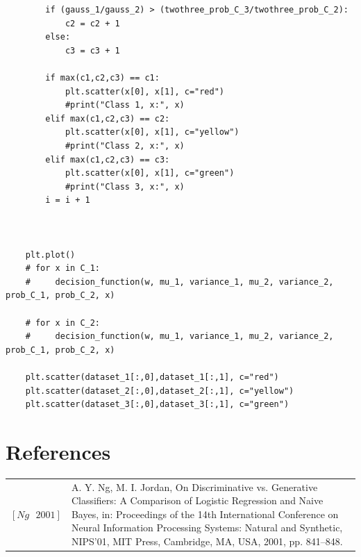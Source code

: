 \begin{lstlisting}
        if (gauss_1/gauss_2) > (twothree_prob_C_3/twothree_prob_C_2):
            c2 = c2 + 1
        else:
            c3 = c3 + 1
        
        if max(c1,c2,c3) == c1:
            plt.scatter(x[0], x[1], c="red")
            #print("Class 1, x:", x)
        elif max(c1,c2,c3) == c2:
            plt.scatter(x[0], x[1], c="yellow")
            #print("Class 2, x:", x)
        elif max(c1,c2,c3) == c3:
            plt.scatter(x[0], x[1], c="green")
            #print("Class 3, x:", x)
        i = i + 1
    
            
        
    plt.plot()
    # for x in C_1:
    #     decision_function(w, mu_1, variance_1, mu_2, variance_2, prob_C_1, prob_C_2, x)
        
    # for x in C_2:
    #     decision_function(w, mu_1, variance_1, mu_2, variance_2, prob_C_1, prob_C_2, x)
    
    plt.scatter(dataset_1[:,0],dataset_1[:,1], c="red")
    plt.scatter(dataset_2[:,0],dataset_2[:,1], c="yellow")
    plt.scatter(dataset_3[:,0],dataset_3[:,1], c="green")
\end{lstlisting}
\section*{References}
\begin{tabular}{lp{15cm}}
	$[Ng \text{ } 2001]$ & A. Y. Ng, M. I. Jordan, On Discriminative vs. Generative Classifiers: A
	Comparison of Logistic Regression and Naive Bayes, in: Proceedings
	of the 14th International Conference on Neural Information Processing
	Systems: Natural and Synthetic, NIPS’01, MIT Press, Cambridge, MA,
	USA, 2001, pp. 841–848.
\end{tabular}
